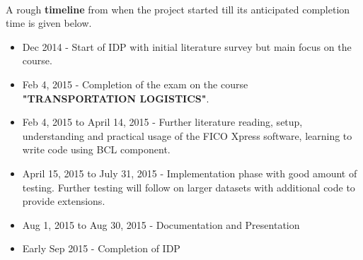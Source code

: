\documentclass[a4paper, 12pt]{article}
\begin{document}
\noindent
\\
A rough \textbf{timeline} from when the project started till its anticipated completion time is given below.
\begin{itemize}
\item Dec 2014 - Start of IDP with initial literature survey but main focus on the course.
\item Feb 4, 2015 - Completion of the exam on the course \textbf{"TRANSPORTATION LOGISTICS"}.
\item Feb 4, 2015 to April 14, 2015 - Further literature reading, setup, understanding and practical usage of the FICO Xpress software, learning to write code using BCL component.
\item April 15, 2015 to July 31, 2015 - Implementation phase with good amount of testing. Further testing will follow on larger datasets with additional code to provide extensions.
\item Aug 1, 2015 to Aug 30, 2015 - Documentation and Presentation
\item Early Sep 2015 - Completion of IDP
\end{itemize}
\end{document}
